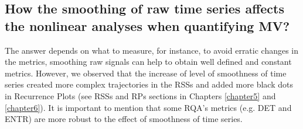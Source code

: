%
%
%
%
%
%
%
%
%
%
%

\subsection*{How the smoothing of raw time series affects the 
	nonlinear analyses when quantifying MV?}

The answer depends on what to measure, for instance, to 
avoid erratic changes in the metrics, smoothing raw signals can help
to obtain well defined and constant metrics.
However, we observed that the increase of level of smoothness 
of time series created more complex trajectories in the RSSs and 
added more black dots in Recurrence Plots 
(see RSSs and RPs sections in Chapters \ref{chapter5} and \ref{chapter6}).
It is important to mention that some RQA's metrics (e.g. DET and  ENTR) 
are more robust to the effect of smoothness of time series.

